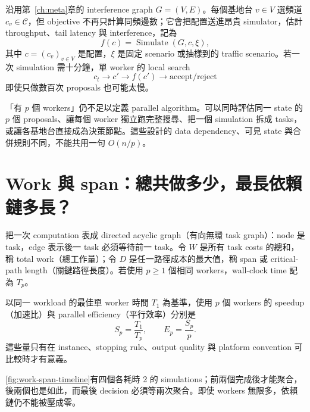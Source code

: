 \documentclass[11pt,a4paper,oneside,openany]{book}
\begin{document}
沿用第~\ref{ch:meta}章的 interference graph $G=(V,E)$。每個基地台 $v\in V$ 選頻道 $c_v\in\mathcal C$，但 objective 不再只計算同頻邊數；它會把配置送進昂貴 simulator，估計 throughput、tail latency 與 interference，記為
\[
 f(c)=\operatorname{Simulate}(G,c,\xi),
\]
其中 $c=(c_v)_{v\in V}$ 是配置，$\xi$ 是固定 scenario 或抽樣到的 traffic scenario。若一次 simulation 需十分鐘，單 worker 的 local search
\[
 c_t\longrightarrow c'\longrightarrow f(c')
 \longrightarrow\text{accept/reject}
\]
即使只做數百次 proposals 也可能太慢。

「有 $p$ 個 workers」仍不足以定義 parallel algorithm。可以同時評估同一 state 的 $p$ 個 proposals、讓每個 worker 獨立跑完整搜尋、把一個 simulation 拆成 tasks，或讓各基地台直接成為決策節點。這些設計的 data dependency、可見 state 與合併規則不同，不能共用一句 $O(n/p)$。

\section{Work 與 span：總共做多少，最長依賴鏈多長？}

把一次 computation 表成 directed acyclic graph（有向無環 task graph）：node 是 task，edge 表示後一 task 必須等待前一 task。令 $W$ 是所有 task costs 的總和，稱 total work（總工作量）；令 $D$ 是任一路徑成本的最大值，稱 span 或 critical-path length（關鍵路徑長度）。若使用 $p\ge1$ 個相同 workers，wall-clock time 記為 $T_p$。

\begin{definition}
以同一 workload 的最佳單 worker 時間 $T_1$ 為基準，使用 $p$ 個 workers 的 speedup（加速比）與 parallel efficiency（平行效率）分別是
\[
 S_p=\frac{T_1}{T_p},
 \qquad
 E_p=\frac{S_p}{p}.
\]
這些量只有在 instance、stopping rule、output quality 與 platform convention 可比較時才有意義。
\end{definition}

\cref{fig:work-span-timeline}有四個各耗時 2 的 simulations；前兩個完成後才能聚合，後兩個也是如此，而最後 decision 必須等兩次聚合。即使 workers 無限多，依賴鏈仍不能被壓成零。
\end{document}
